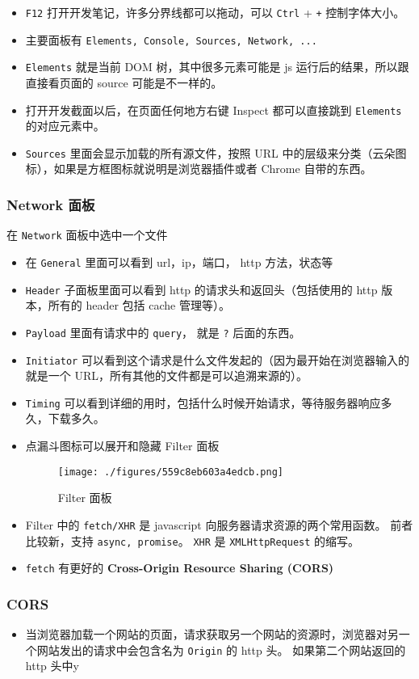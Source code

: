 

\begin{issues}
\issueDraft
\end{issues}

\begin{itemize}
\item \verb`F12` 打开开发笔记，许多分界线都可以拖动，可以 \verb`Ctrl` + \verb`+` 控制字体大小。
\item 主要面板有 \verb`Elements, Console, Sources, Network, ...`
\item \verb`Elements` 就是当前 DOM 树，其中很多元素可能是 js 运行后的结果，所以跟直接看页面的 source 可能是不一样的。
\item 打开开发截面以后，在页面任何地方右键 Inspect 都可以直接跳到 \verb`Elements` 的对应元素中。
\item \verb`Sources` 里面会显示加载的所有源文件，按照 URL 中的层级来分类（云朵图标），如果是方框图标就说明是浏览器插件或者 Chrome 自带的东西。
\end{itemize}

\subsubsection{Network 面板}
在 \verb`Network` 面板中选中一个文件
\begin{itemize}
\item 在 \verb`General` 里面可以看到 url，ip，端口， http 方法，状态等
\item \verb`Header` 子面板里面可以看到 http 的请求头和返回头（包括使用的 http 版本，所有的 header 包括 cache 管理等）。
\item \verb`Payload` 里面有请求中的 \verb`query`， 就是 \verb`?` 后面的东西。
\item \verb`Initiator` 可以看到这个请求是什么文件发起的（因为最开始在浏览器输入的就是一个 URL，所有其他的文件都是可以追溯来源的）。
\item \verb`Timing` 可以看到详细的用时，包括什么时候开始请求，等待服务器响应多久，下载多久。
\item 点漏斗图标可以展开和隐藏 Filter 面板
\begin{figure}[ht]
\centering
\texttt{[image: ./figures/559c8eb603a4edcb.png]}
\caption{Filter 面板} \label{fig_chrmDv_1}
\end{figure}
\item Filter 中的 \verb`fetch/XHR` 是 javascript 向服务器请求资源的两个常用函数。 前者比较新，支持 \verb`async, promise`。 \verb`XHR` 是 \verb`XMLHttpRequest` 的缩写。
\item \verb`fetch` 有更好的 \textbf{Cross-Origin Resource Sharing (CORS)}
\end{itemize}

\subsubsection{CORS}
\begin{itemize}
\item 当浏览器加载一个网站的页面，请求获取另一个网站的资源时，浏览器对另一个网站发出的请求中会包含名为 \verb`Origin` 的 http 头。 如果第二个网站返回的 http 头中y
\end{itemize}
 